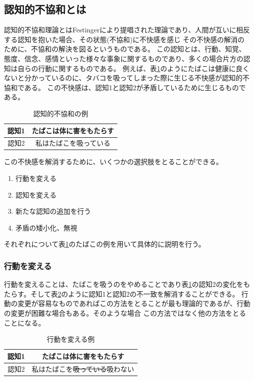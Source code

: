 \documentclass{kuisthesis}
\begin{document}
\subsection{認知的不協和とは} %
\label{sec: CDT}
認知的不協和理論\cite{Festinger1957}とはFestingerにより提唱された理論であり、人間が互いに相反する認知を抱いた場合、その状態(不協和)に不快感を感じ
その不快感の解消のために、不協和の解決を図るというものである。
この認知とは、行動、知覚、態度、信念、感情といった様々な事象に関するものであり、多くの場合片方の認知は自らの行動に関するものである。
例えば、表\ref{fig: CDTExample}のようにたばこは健康に良くないと分かっているのに、タバコを吸ってしまった際に生じる不快感が認知的不協和である。
この不快感は、認知1と認知2が矛盾しているために生じるものである。
\begin{table}[H]
  \centering
  \begin{tabular}{c|c}
      認知1 & たばこは体に害をもたらす  \\ \hline
      認知2 & 私はたばこを吸っている \\ 
  \end{tabular}
  \caption{認知的不協和の例}
  \label{fig: CDTExample}
\end{table}


この不快感を解消するために、いくつかの選択肢をとることができる。
\begin{enumerate}
  \item 行動を変える
  \item 認知を変える
  \item 新たな認知の追加を行う
  \item 矛盾の矮小化、無視
\end{enumerate}
それぞれについて表\ref{fig: CDTExample}のたばこの例を用いて具体的に説明を行う。
\subsubsection{行動を変える}
行動を変えることは、たばこを吸うのをやめることであり表\ref{fig: CDTExample}の認知2の変化をもたらす。そして表\ref{fig: ReduceDissonanceAction}のように認知1と認知2の不一致を解消することができる。
行動の変更が容易なものであればこの方法をとることが最も理論的であるが、行動の変更が困難な場合もある。そのような場合
この方法ではなく他の方法をとることになる。
\begin{table}[h]
  \centering
  \begin{tabular}{c|c}

      認知1 & たばこは体に害をもたらす  \\ \hline
      認知2 & 私はたばこを\sout{吸っている}吸わない \\
  \end{tabular}
  \caption{行動を変える例}
  \label{fig: ReduceDissonanceAction}


\end{table}
\end{document}
